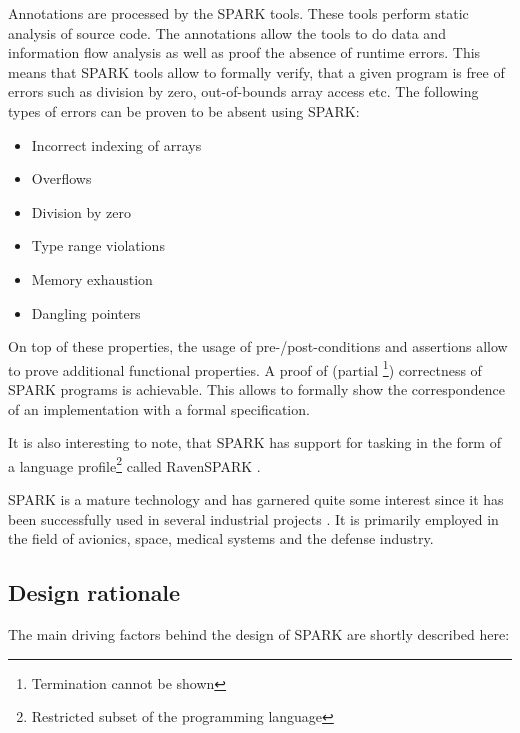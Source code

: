 Annotations are processed by the SPARK tools. These tools perform static
analysis of source code. The annotations allow the tools to do data and
information flow analysis as well as proof the absence of runtime errors. This
means that SPARK tools allow to formally verify, that a given program is free
of errors such as division by zero, out-of-bounds array access etc. The
following types of errors can be proven to be absent using SPARK:

\begin{itemize}
	\item Incorrect indexing of arrays
	\item Overflows
	\item Division by zero
	\item Type range violations
	\item Memory exhaustion
	\item Dangling pointers
\end{itemize}

On top of these properties, the usage of pre-/post-conditions and assertions
allow to prove additional functional properties. A proof of (partial
\footnote{Termination cannot be shown}) correctness of SPARK programs is
achievable. This allows to formally show the correspondence of an implementation
with a formal specification.

It is also interesting to note, that SPARK has support for tasking in the form
of a language profile\footnote{Restricted subset of the programming language}
called RavenSPARK \cite{RavenSPARK}.

SPARK is a mature technology and has garnered quite some interest since it has
been successfully used in several industrial projects
\cite{Chapman:2000:IES:369264.369270}. It is primarily employed in the field of
avionics, space, medical systems and the defense industry.

\subsection{Design rationale}
The main driving factors behind the design of SPARK are shortly described here:

